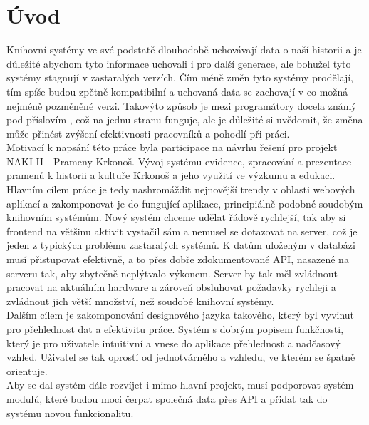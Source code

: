 \chapter*{Úvod}
Knihovní systémy ve své podstatě dlouhodobě uchovávají data o naší historii a je důležité abychom
tyto informace uchovali i pro další generace, ale bohužel tyto systémy stagnují v
zastaralých verzích. Čím méně změn tyto systémy prodělají, tím spíše budou zpětně
kompatibilní a uchovaná data se zachovají v co možná nejméně pozměněné verzi.
Takovýto způsob je mezi programátory docela známý pod příslovím
, což na jednu stranu funguje, ale
je důležité si uvědomit, že změna může přinést
zvýšení efektivnosti pracovníků a pohodlí při práci.
\\

Motivací k napsání této práce byla participace na návrhu řešení
pro projekt NAKI II - Prameny Krkonoš. Vývoj systému evidence,
zpracování a prezentace pramenů k historii a kultuře Krkonoš a
jeho využití ve výzkumu a edukaci. 
\\

Hlavním cílem práce je tedy nashromáždit nejnovější trendy v oblasti webových
aplikací a zakomponovat je do fungující aplikace, principiálně podobné
soudobým knihovním systémům. Nový systém chceme udělat řádově rychlejší,
tak aby si frontend na většinu aktivit vystačil sám a nemusel se dotazovat
na server, což je jeden z typických problému zastaralých systémů.
K datům uloženým v databázi musí přistupovat efektivně, a to přes
dobře zdokumentované API, nasazené na serveru tak, aby zbytečně
neplýtvalo výkonem. Server by tak měl zvládnout pracovat na
aktuálním hardware a zároveň obsluhovat požadavky rychleji a
zvládnout jich větší množství, než soudobé knihovní systémy.
\\

Dalším cílem je zakomponování designového jazyka takového,
který byl vyvinut pro přehlednost dat a efektivitu práce.
Systém s dobrým popisem funkčnosti, který je pro uživatele 
intuitivní a vnese do aplikace přehlednost a nadčasový vzhled.
Uživatel se tak oprostí od jednotvárného a  vzhledu,
ve kterém se špatně orientuje.
\\

Aby se dal systém dále rozvíjet i mimo hlavní projekt, musí
podporovat systém modulů, které budou moci čerpat společná data přes
API a přidat tak do systému novou funkcionalitu.

